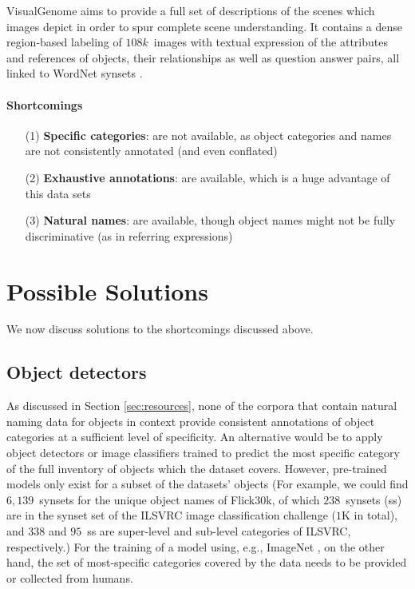 \documentclass[runningheads]{llncs}
\newcommand{\vgenome}{VisualGenome\xspace}
\begin{document}
\vgenome \cite{krishna2016visualgenome} aims to provide a full set of descriptions of the scenes which images depict in order to spur complete scene understanding. 
It contains a dense region-based labeling of $108k$~images with textual expression of the attributes and references of objects, their relationships as well as question answer pairs, all linked to WordNet synsets \cite[see below]{fellbaum1998wordnet}. 

\paragraph{Shortcomings}


\begin{itemize}
     		\item[(1)] \textbf{Specific categories}: are not available, as object categories and names are not consistently annotated (and even conflated)
				\item[(2)] \textbf{Exhaustive annotations}: are available, which is a huge advantage of this data sets
		   \item[(3)] \textbf{Natural names}: are available, though object names might not be fully discriminative (as in referring expressions)

\end{itemize}

\section{Possible Solutions}

We now discuss solutions to the shortcomings discussed above.

\subsection{Object detectors}
As discussed in Section \ref{sec:resources}, none of the corpora that contain natural naming data for objects in context provide consistent annotations of object categories at a sufficient level of specificity.
An alternative would be to apply object detectors or image classifiers trained to predict the most specific category of the full inventory of objects which the dataset covers. 
However, pre-trained models only exist for a subset of the datasets' objects  (For example, we could find $6,139$~synsets for the unique object names of Flick30k, of which $238$~synsets (ss) are in the synset set of the ILSVRC image classification challenge ($1$K in total), and $338$ and $95$~ss are super-level and sub-level categories of ILSVRC, respectively.)
For the training of a model using, e.g., ImageNet \cite{imagenet_cvpr09}, on the other hand, the  set of most-specific categories covered by the data needs to be provided or collected from humans. 
\end{document}
